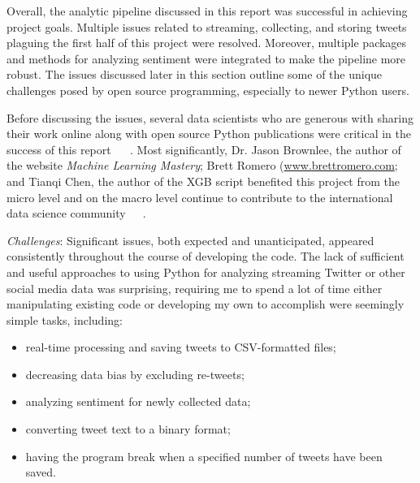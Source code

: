 Overall, the analytic pipeline discussed in this report was successful in achieving 
project goals.  Multiple issues related to streaming, collecting,
and storing tweets plaguing the first half of
this project were resolved.  Moreover, multiple
packages and methods for analyzing sentiment were integrated to make the pipeline 
more robust.  The issues discussed later in this section
outline some of the unique challenges posed by open source programming, especially to newer
Python users.  

Before discussing the issues, several data scientists who are generous with sharing 
their work online along with open source Python publications were critical in the 
success of this report ~\cite{sweigart2015} ~\cite{ojeda2014}.  Most significantly, 
Dr. Jason Brownlee, the author of the website \emph{Machine Learning Mastery}; Brett 
Romero (\url{www.brettromero.com}; and Tianqi Chen, the author of the XGB script
benefited this project from the micro level and on the macro level continue to contribute 
to the international data science community~\cite{brownlee_2016}~\cite{romero2016}~\cite{Chen2016}.

\emph{Challenges}: Significant issues, both expected and
unanticipated, appeared consistently throughout
the course of developing the code.  The lack of
sufficient and useful approaches to using Python
for analyzing streaming Twitter or other social
media data was surprising, requiring me to spend a
lot of time either manipulating existing code or
developing my own to accomplish were seemingly simple tasks, including:

\begin{itemize}	
\item real-time processing and saving tweets to CSV-formatted files;
\item decreasing data bias by excluding re-tweets;
\item analyzing sentiment for newly collected
data;
\item converting tweet text to a binary format;
\item having the program break when a specified
number of tweets have been saved.
\end{itemize}

